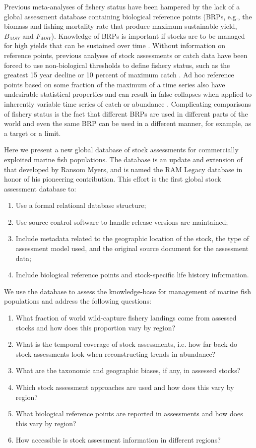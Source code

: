 \documentclass[letterpaper,12pt]{article}
\begin{document}
Previous meta-analyses of fishery status have been hampered by the
lack of a global assessment database containing biological reference
points (BRPs, e.g., the biomass and fishing mortality rate that
produce maximum sustainable yield, $B_{MSY}$ and $F_{MSY}$).  Knowledge of BRPs
is important if stocks are to be managed for high yields that can be
sustained over time \citep{Mace:1994:cjfas}.  Without information on
reference points, previous analyses of stock assessments or catch data
have been forced to use non-biological thresholds to define fishery
status, such as the greatest 15 year decline
\citep{Hutchings:Reynolds:2004:biosci} or 10 percent of maximum catch
\citep{Worm:etal:2006:science}. Ad hoc reference points based on some
fraction of the maximum of a time series also have undesirable
statistical properties and can result in false collapses when applied
to inherently variable time series of catch or abundance
\citep{Wilberg:Miller:2007:science, branch:2008:marpol}.  Complicating
comparisons of fishery status is the fact that different BRPs are used
in different parts of the world and even the same BRP can be used in a
different manner, for example, as a target or a limit. 

Here we present a new global database of stock assessments for
commercially exploited marine fish populations.  The database is an
update and extension of that developed by Ransom Myers, and is named
the RAM Legacy database in honor of his pioneering contribution.  This
effort is the first global stock assessment database to:
\begin{enumerate}
\item Use a formal relational database structure;
\item Use source control software to handle release versions are maintained;
\item Include metadata related to the geographic location of the stock, the type of assessment model used, and the original source document for the assessment data;
\item Include biological reference points and stock-specific life history information. 
\end{enumerate}

We use the database to assess the knowledge-base for management of marine fish populations and address the following questions:
\begin{enumerate}
\item What fraction of world wild-capture fishery landings come from assessed stocks and how does this proportion vary by region?
\item What is the temporal coverage of stock assessments, i.e. how far back do stock assessments look when reconstructing trends in abundance?
\item What are the taxonomic and geographic biases, if any, in assessed stocks?
\item Which stock assessment approaches are used and how does this vary by region?
\item What biological reference points are reported in assessments and how does this vary by region?
\item How accessible is stock assessment information in different regions?
\end{enumerate}
\end{document}
